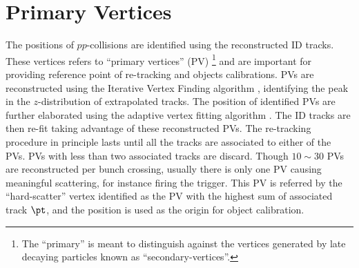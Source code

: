 \section{Primary Vertices} \label{sec::objDef::PV}
The positions of $pp$-collisions are identified using the reconstructed ID tracks. These vertices refers to ``primary vertices'' (PV) 
\footnote{The ``primary'' is meant to distinguish against the vertices generated by late decaying particles known as ``secondary-vertices''.}
and are important for providing reference point of re-tracking and objects calibrations.
PVs are reconstructed using the Iterative Vertex Finding algorithm \cite{134_vertexing_Run1}\cite{135_vertexing_Run1_2012}, identifying the peak in the $z$-distribution of extrapolated tracks. The position of identified PVs are further elaborated using the adaptive vertex fitting algorithm \cite{136_adaVertexFit}.
The ID tracks are then re-fit taking advantage of these reconstructed PVs. The re-tracking procedure in principle lasts until all the tracks are associated to either of the PVs. PVs with less than two associated tracks are discard.  
Though $10\sim30$ PVs are reconstructed per bunch crossing, usually there is only one PV causing meaningful scattering, for instance firing the trigger. This PV is referred by the ``hard-scatter'' vertex  identified as the PV with the highest sum of associated track $\pt$, and the position is used as the origin for object calibration. \\




